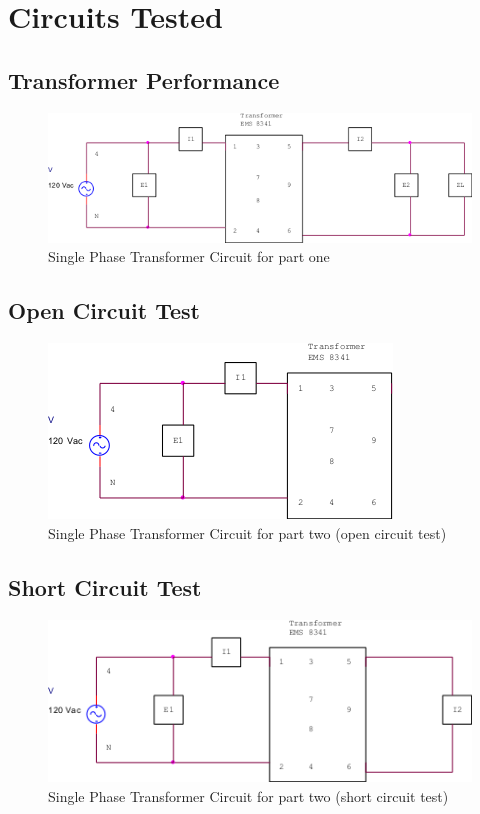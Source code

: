 \documentclass{article}
\begin{document}
\pagebreak
\section*{Circuits Tested}
\subsection*{Transformer Performance}
\begin{figure}[H]
  \centering
  \includegraphics[width=.8\textwidth]{img/circuit_01}
  \caption{Single Phase Transformer Circuit for part one}
  \label{fig:circuit_01}
\end{figure}

\subsection*{Open Circuit Test}
\begin{figure}[H]
  \centering
  \includegraphics[width=.8\textwidth]{img/circuit_02}
  \caption{Single Phase Transformer Circuit for part two (open circuit test)}
  \label{fig:circuit_02}
\end{figure}

\subsection*{Short Circuit Test}
\begin{figure}[H]
  \centering
  \includegraphics[width=.8\textwidth]{img/circuit_03}
  \caption{Single Phase Transformer Circuit for part two (short circuit test)}
  \label{fig:circuit_03}
\end{figure}
\end{document}
